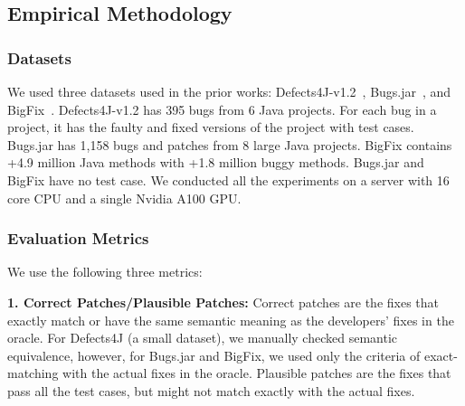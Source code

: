 \subsection{Empirical Methodology}
\label{eval-methodology:sec}

\subsubsection{Datasets}
We used three datasets used in the prior works:
Defects4J-v1.2~\cite{defects4j}, Bugs.jar~\cite{saha2018bugs}, and
BigFix~\cite{yioopsla19}. Defects4J-v1.2 has 395 bugs from 6 Java
projects. For each bug in a project, it has the faulty and fixed
versions of the project with test cases. Bugs.jar has 1,158 bugs and
patches from 8 large Java projects. BigFix contains +4.9 million Java
methods with +1.8 million buggy methods. Bugs.jar and BigFix have
no test case. We conducted all the experiments on a
server with 16 core CPU and a single Nvidia A100 GPU.


\subsubsection{Evaluation Metrics}

We use the following three metrics:


{\bf 1. Correct Patches/Plausible Patches:} Correct patches are the
fixes that exactly match or have the same semantic meaning as the
developers' fixes in the oracle. For Defects4J (a small dataset), we
manually checked semantic equivalence, however, for Bugs.jar and
BigFix, we used only the criteria of exact-matching with the actual
fixes in the oracle.
%
Plausible patches are the fixes that pass all the test cases, but
might not match exactly with the actual fixes.

